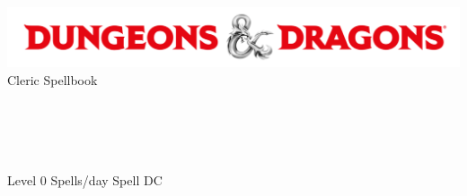 \documentclass[a4paper]{memoir}
\begin{document}
\LARGE
\begin{center}
\includegraphics[width=.5\textwidth]{dnd-logo}\\
Cleric Spellbook\\
\end{center}

\LARGE
\textbf{}\\
\textbf{}\\
\textbf{}\\
\textbf{}\\
Level 0 \hfill Spells/day\underline{\hspace{.25in}} Spell DC\underline{\hspace{.25in}}\\
\end{document}
